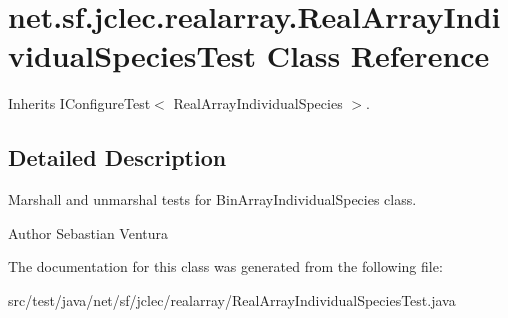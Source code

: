 \hypertarget{classnet_1_1sf_1_1jclec_1_1realarray_1_1_real_array_individual_species_test}{\section{net.\-sf.\-jclec.\-realarray.\-Real\-Array\-Individual\-Species\-Test Class Reference}
\label{classnet_1_1sf_1_1jclec_1_1realarray_1_1_real_array_individual_species_test}
}


Inherits I\-Configure\-Test$<$ Real\-Array\-Individual\-Species $>$.



\subsection{Detailed Description}
Marshall and unmarshal tests for Bin\-Array\-Individual\-Species class.

\begin{DoxyAuthor}{Author}
Sebastian Ventura 
\end{DoxyAuthor}


The documentation for this class was generated from the following file\-:\begin{DoxyCompactItemize}
\item 
src/test/java/net/sf/jclec/realarray/Real\-Array\-Individual\-Species\-Test.\-java\end{DoxyCompactItemize}
